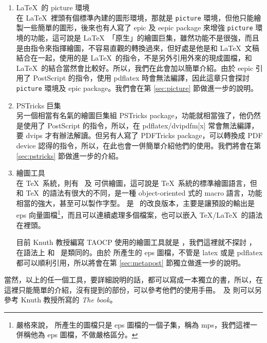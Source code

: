 \begin{enumerate}
  \item \LaTeX\ 的 {\ttfamily picture} 環境 \\
        在 \LaTeX\ 裡頭有個標準內建的圖形環境，那就是 \texttt{picture} 環境，但他只能繪製一些簡單的圖形，後來也有人寫了 \textsf{epic} 及 \textsf{eepic} package 來增強 \texttt{picture} 環境的功能，這可說是 \LaTeX\ 「原生」的繪圖巨集，雖然功能不是很強，而且是由指令來指揮繪圖，不容易直觀的轉換過來，但好處是他是和 \LaTeX\ 文稿結合在一起，使用的是 \LaTeX\ 的指令，不是另外引用外來的現成圖檔，和 \LaTeX\ 的結合當然會比較好。所以，我們在此會加以簡單介紹。由於 {\sffamily eepic} 引用了 {\sc PostScript} 的指令，使用 {\ttfamily pdflatex} 時會無法編譯，因此這章只會探討 \texttt{picture} 環境及 {\sffamily epic} package。我們會在第 \ref{sec:picture} 節做進一步的說明。

  \item {\sffamily PSTricks} 巨集 \\
        另一個相當有名氣的繪圖巨集組 {\sffamily PSTricks} package，功能就相當強了，他仍然是使用了 {\sc PostScript} 的指令，所以，在 {\ttfamily pdflatex/dvipdfm[x]} 常會無法編譯，要 {\ttfamily dvips} 才有辦法解讀。但另有人寫了 {\sffamily PDFTricks} package，可以轉換成 PDF device 認得的指令，所以，在此也會一併簡單介紹他們的使用。我們將會在第 \ref{sec:pstricks} 節做進一步的介紹。

  \item \MP{} 繪圖工具\\
        在 \TeX\ 系統，則有 \MF\ 及 \MP{} 可供繪圖，這可說是 \TeX\ 系統的標準繪圖語言，但和 \TeX\ 的語法有很大的不同，是一種 object-oriented 式的 macro 語言，功能相當的強大，甚至可以製作字型。\MP{} 是 \MF\ 的改良版本，主要是讓預設的輸出是 eps 向量圖檔\footnote{嚴格來說，\MP{} 所產生的圖檔只是 eps 圖檔的一個子集，稱為 mps，我們這裡一併稱他為 eps 圖檔，不做嚴格區分。}，而且可以連續處理多個檔案，也可以嵌入 \TeX/\LaTeX\ 的語法在裡頭。

        目前 Knuth 教授編寫 TAOCP 使用的繪圖工具就是 \MP{}，我們這裡就不探討 \MF{}，在語法上 \MP{} 和 \MF\ 是類同的。由於 \MP{} 所產生的 eps 圖檔，不管是 {\ttfamily latex} 或是 {\ttfamily pdflatex} 都可以順利引用，所以將會在第 \ref{sec:metapost} 節獨立做進一步的說明。
\end{enumerate}

當然，以上的任一個工具，要詳細說明的話，都可以寫成一本獨立的書，所以，在這裡只能簡單的介紹，沒有提到的部份，可以參考他們的使用手冊。\MF\ 及 \MP{} 則可以另參考 Knuth 教授所寫的 \textit{The \MF{}book}。

